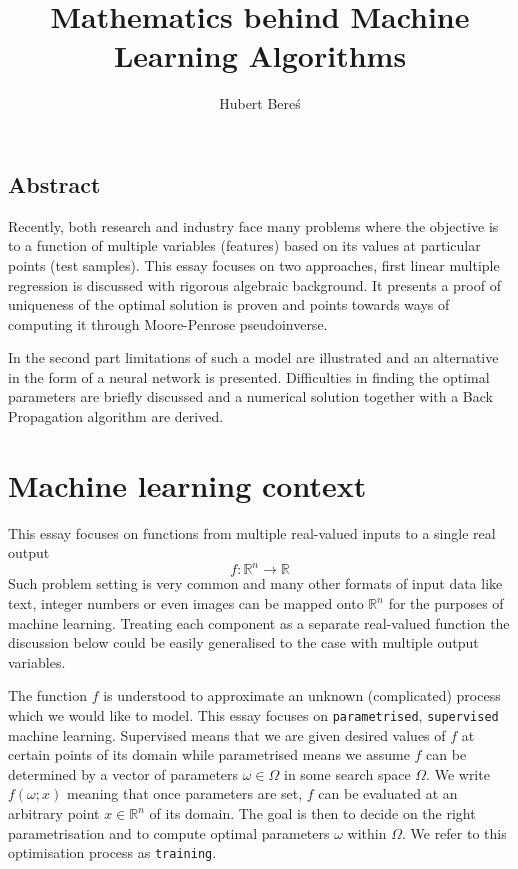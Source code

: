 \documentclass[a4paper,11pt]{article}
\title{Mathematics behind Machine Learning Algorithms}
\author{Hubert Bereś}
\theoremstyle{break}
\newcommand{\R}{\mathbb{R}}
\begin{document}
\maketitle

\subsection*{Abstract}


Recently, both research and industry face many problems where the objective is to  a function of multiple variables (features) based on its values at particular points (test samples). This essay focuses on two approaches, first linear multiple regression is discussed with rigorous algebraic background. It presents a proof of uniqueness of the optimal solution is proven and points towards ways of computing it through Moore-Penrose pseudoinverse.

In the second part limitations of such a model are illustrated and an alternative in the form of a neural network is presented. Difficulties in finding the optimal parameters are briefly discussed and a numerical solution together with a Back Propagation algorithm are derived.

\section{Machine learning context}

This essay focuses on functions from multiple real-valued inputs to a single real output
$$ f : \R^n \to \R $$
Such problem setting is very common and many other formats of input data like text, integer numbers or even images can be mapped onto $\R^n$ for the purposes of machine learning.
Treating each  component as a separate real-valued function the discussion below could be easily generalised to the case with multiple output variables.

The function $f$ is understood to approximate an unknown (complicated) process which we would like to model.
This essay focuses on {\tt parametrised}, {\tt supervised} machine learning.
Supervised means that we are given desired values of $f$ at certain points of its domain while parametrised means we assume $f$ can be determined by a vector of parameters $ \omega \in \Omega$ in some search space $\Omega$.
We write $ f(\omega; x) $ meaning that once parameters are set, $f$ can be evaluated at an arbitrary point $x \in \R^n$ of its domain.
The goal is then to decide on the right parametrisation and to compute optimal parameters $\omega$ within $\Omega$. We refer to this optimisation process as {\tt training}.
\end{document}
